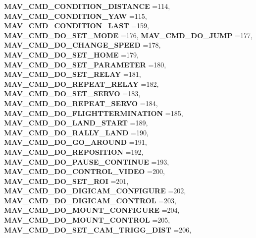 \begin{DoxyCompactItemize}
\textbf{ M\+A\+V\+\_\+\+C\+M\+D\+\_\+\+C\+O\+N\+D\+I\+T\+I\+O\+N\+\_\+\+D\+I\+S\+T\+A\+N\+CE} =114, 
\textbf{ M\+A\+V\+\_\+\+C\+M\+D\+\_\+\+C\+O\+N\+D\+I\+T\+I\+O\+N\+\_\+\+Y\+AW} =115, 
\textbf{ M\+A\+V\+\_\+\+C\+M\+D\+\_\+\+C\+O\+N\+D\+I\+T\+I\+O\+N\+\_\+\+L\+A\+ST} =159, 
\textbf{ M\+A\+V\+\_\+\+C\+M\+D\+\_\+\+D\+O\+\_\+\+S\+E\+T\+\_\+\+M\+O\+DE} =176, 
\newline
\textbf{ M\+A\+V\+\_\+\+C\+M\+D\+\_\+\+D\+O\+\_\+\+J\+U\+MP} =177, 
\textbf{ M\+A\+V\+\_\+\+C\+M\+D\+\_\+\+D\+O\+\_\+\+C\+H\+A\+N\+G\+E\+\_\+\+S\+P\+E\+ED} =178, 
\textbf{ M\+A\+V\+\_\+\+C\+M\+D\+\_\+\+D\+O\+\_\+\+S\+E\+T\+\_\+\+H\+O\+ME} =179, 
\textbf{ M\+A\+V\+\_\+\+C\+M\+D\+\_\+\+D\+O\+\_\+\+S\+E\+T\+\_\+\+P\+A\+R\+A\+M\+E\+T\+ER} =180, 
\newline
\textbf{ M\+A\+V\+\_\+\+C\+M\+D\+\_\+\+D\+O\+\_\+\+S\+E\+T\+\_\+\+R\+E\+L\+AY} =181, 
\textbf{ M\+A\+V\+\_\+\+C\+M\+D\+\_\+\+D\+O\+\_\+\+R\+E\+P\+E\+A\+T\+\_\+\+R\+E\+L\+AY} =182, 
\textbf{ M\+A\+V\+\_\+\+C\+M\+D\+\_\+\+D\+O\+\_\+\+S\+E\+T\+\_\+\+S\+E\+R\+VO} =183, 
\textbf{ M\+A\+V\+\_\+\+C\+M\+D\+\_\+\+D\+O\+\_\+\+R\+E\+P\+E\+A\+T\+\_\+\+S\+E\+R\+VO} =184, 
\newline
\textbf{ M\+A\+V\+\_\+\+C\+M\+D\+\_\+\+D\+O\+\_\+\+F\+L\+I\+G\+H\+T\+T\+E\+R\+M\+I\+N\+A\+T\+I\+ON} =185, 
\textbf{ M\+A\+V\+\_\+\+C\+M\+D\+\_\+\+D\+O\+\_\+\+L\+A\+N\+D\+\_\+\+S\+T\+A\+RT} =189, 
\textbf{ M\+A\+V\+\_\+\+C\+M\+D\+\_\+\+D\+O\+\_\+\+R\+A\+L\+L\+Y\+\_\+\+L\+A\+ND} =190, 
\textbf{ M\+A\+V\+\_\+\+C\+M\+D\+\_\+\+D\+O\+\_\+\+G\+O\+\_\+\+A\+R\+O\+U\+ND} =191, 
\newline
\textbf{ M\+A\+V\+\_\+\+C\+M\+D\+\_\+\+D\+O\+\_\+\+R\+E\+P\+O\+S\+I\+T\+I\+ON} =192, 
\textbf{ M\+A\+V\+\_\+\+C\+M\+D\+\_\+\+D\+O\+\_\+\+P\+A\+U\+S\+E\+\_\+\+C\+O\+N\+T\+I\+N\+UE} =193, 
\textbf{ M\+A\+V\+\_\+\+C\+M\+D\+\_\+\+D\+O\+\_\+\+C\+O\+N\+T\+R\+O\+L\+\_\+\+V\+I\+D\+EO} =200, 
\textbf{ M\+A\+V\+\_\+\+C\+M\+D\+\_\+\+D\+O\+\_\+\+S\+E\+T\+\_\+\+R\+OI} =201, 
\newline
\textbf{ M\+A\+V\+\_\+\+C\+M\+D\+\_\+\+D\+O\+\_\+\+D\+I\+G\+I\+C\+A\+M\+\_\+\+C\+O\+N\+F\+I\+G\+U\+RE} =202, 
\textbf{ M\+A\+V\+\_\+\+C\+M\+D\+\_\+\+D\+O\+\_\+\+D\+I\+G\+I\+C\+A\+M\+\_\+\+C\+O\+N\+T\+R\+OL} =203, 
\textbf{ M\+A\+V\+\_\+\+C\+M\+D\+\_\+\+D\+O\+\_\+\+M\+O\+U\+N\+T\+\_\+\+C\+O\+N\+F\+I\+G\+U\+RE} =204, 
\textbf{ M\+A\+V\+\_\+\+C\+M\+D\+\_\+\+D\+O\+\_\+\+M\+O\+U\+N\+T\+\_\+\+C\+O\+N\+T\+R\+OL} =205, 
\newline
\textbf{ M\+A\+V\+\_\+\+C\+M\+D\+\_\+\+D\+O\+\_\+\+S\+E\+T\+\_\+\+C\+A\+M\+\_\+\+T\+R\+I\+G\+G\+\_\+\+D\+I\+ST} =206, 

\end{DoxyCompactItemize}
